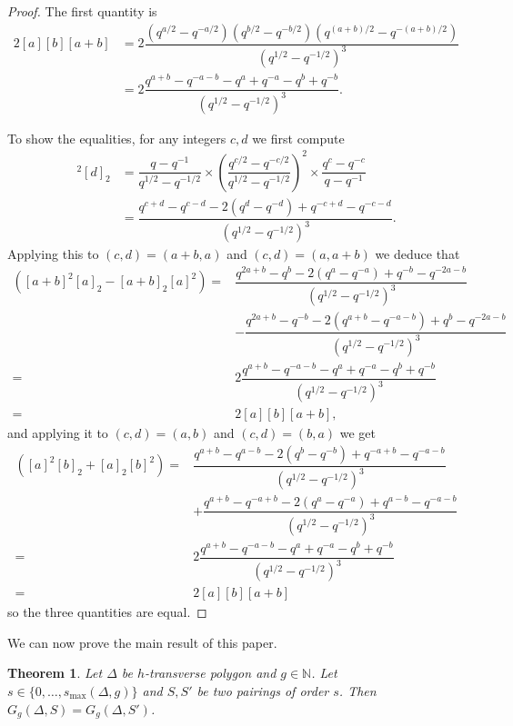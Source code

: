 \documentclass[11pt]{article}
\newtheorem{theo}{Theorem}[section]
\theoremstyle{definition}
\numberwithin{equation}{section}
\newcommand{\N}{\mathbb{N}}
\newcommand{\smax}{s_{\max}}
\theoremstyle{plain}
\begin{document}
\begin{proof}
The first quantity is
\begin{align*}
2[a][b][a+b] &= 2 \dfrac{(q^{a/2}-q^{-a/2}) (q^{b/2}-q^{-b/2}) (q^{(a+b)/2}-q^{-(a+b)/2})}{(q^{1/2}-q^{-1/2})^3}  \\
  &= 2 \dfrac{ q^{a+b} - q^{-a-b} -q^a + q^{-a} -q^b +q^{-b} }{(q^{1/2}-q^{-1/2})^3}.
\end{align*}

To show the equalities, for any integers $c,d$ we first compute
\begin{align*}
[2][c]^2[d]_2 &= \dfrac{q-q^{-1}}{q^{1/2}-q^{-1/2}} \times \left(\dfrac{q^{c/2}-q^{-c/2}}{q^{1/2}-q^{-1/2}}\right)^2 \times \dfrac{q^c-q^{-c}}{q-q^{-1}}  \\
  &= \dfrac{q^{c+d} - q^{c-d} - 2(q^d-q^{-d}) + q^{-c+d} - q^{-c-d}}{(q^{1/2}-q^{-1/2})^3}.
\end{align*}
Applying this to $(c,d) = (a+b,a)$ and $(c,d) = (a,a+b)$ we deduce that
\begin{align*}
 [2]\left([a+b]^2[a]_2 - [a+b]_2[a]^2\right) 
    ={} &   \dfrac{q^{2a+b} - q^b- 2(q^a-q^{-a}) + q^{-b} - q^{-2a-b}}{(q^{1/2}-q^{-1/2})^3} \\
    & - \dfrac{q^{2a+b} - q^{-b} - 2(q^{a+b}-q^{-a-b}) + q^b - q^{-2a-b}}{(q^{1/2}-q^{-1/2})^3} \\
    ={} & 2 \dfrac{ q^{a+b} - q^{-a-b} -q^a + q^{-a} -q^b +q^{-b} }{(q^{1/2}-q^{-1/2})^3} \\
    ={} & 2[a][b][a+b],
\end{align*}
and applying it to $(c,d) = (a,b)$ and $(c,d) = (b,a)$ we get
\begin{align*}
[2]\left([a]^2[b]_2 + [a]_2[b]^2\right) 
    ={} &  \dfrac{q^{a+b} - q^{a-b} - 2(q^b-q^{-b}) + q^{-a+b} - q^{-a-b}}{(q^{1/2}-q^{-1/2})^3} \\
    & + \dfrac{q^{a+b} - q^{-a+b} - 2(q^a-q^{-a}) + q^{a-b} - q^{-a-b}}{(q^{1/2}-q^{-1/2})^3} \\
    ={} & 2 \dfrac{ q^{a+b} - q^{-a-b} -q^a + q^{-a} -q^b +q^{-b} }{(q^{1/2}-q^{-1/2})^3} \\
    ={} & 2[a][b][a+b] 
\end{align*}
so the three quantities are equal.
\end{proof}


We can now prove the main result of this paper.

\begin{theo} \label{theo-invS}
Let $\Delta$ be $h$-transverse polygon and $g\in\N$. Let $s\in \{0,\dots,\smax(\Delta,g)\}$ and $S,S'$ be two pairings of order $s$. Then $G_g(\Delta,S) = G_g(\Delta,S')$.
\end{theo}
\end{document}
